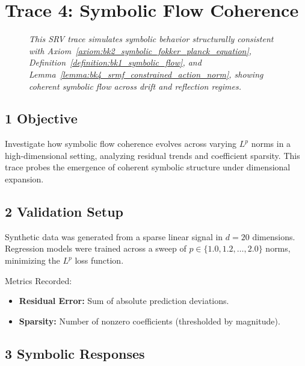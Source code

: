\section*{Trace 4: Symbolic Flow Coherence}
\label{section:trace4_symbolic_flow_coherence}

\begin{figure}[htbp]
\centering
\caption[\textit{SRV trace (summary)}]{\textit{This SRV trace simulates symbolic behavior structurally consistent with Axiom~\ref{axiom:bk2_symbolic_fokker_planck_equation}, Definition~\ref{definition:bk1_symbolic_flow}, and Lemma~\ref{lemma:bk4_srmf_constrained_action_norm}, showing coherent symbolic flow across drift and reflection regimes.}}
\label{figure:trace4_flow_coherence_summary}
\end{figure}

\subsection*{1 Objective}
\label{subsection:trace4_objective}

Investigate how symbolic flow coherence evolves across varying $L^p$ norms in a high-dimensional setting, analyzing residual trends and coefficient sparsity. This trace probes the emergence of coherent symbolic structure under dimensional expansion.

\subsection*{2 Validation Setup}
\label{subsection:trace4_validation_setup}

Synthetic data was generated from a sparse linear signal in $d = 20$ dimensions. Regression models were trained across a sweep of $p \in \{1.0, 1.2, \ldots, 2.0\}$ norms, minimizing the $L^p$ loss function.

Metrics Recorded:
\begin{itemize}
    \item \textbf{Residual Error:} Sum of absolute prediction deviations.
    \item \textbf{Sparsity:} Number of nonzero coefficients (thresholded by magnitude).
\end{itemize}

\subsection*{3 Symbolic Responses}
\label{subsection:trace4_symbolic_responses}

